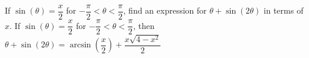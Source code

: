  {If $\sin(\theta) = \dfrac{x}{2}$ for $-\dfrac{\pi}{2} < \theta < \dfrac{\pi}{2}$, find an expression for $\theta + \sin(2\theta)$ in terms of $x$.}
{ If $\sin(\theta) = \dfrac{x}{2}$ for $-\dfrac{\pi}{2} < \theta < \dfrac{\pi}{2}$, then $\theta + \sin(2\theta) = \arcsin \left( \dfrac{x}{2} \right) + \dfrac{x\sqrt{4 - x^{2}}}{2}$}
